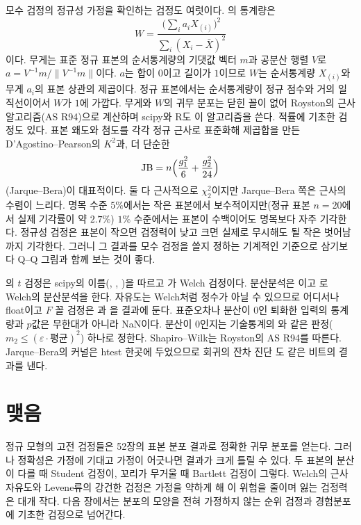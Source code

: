 모수 검정의 정규성 가정을 확인하는 검정도 여럿이다. 의 통계량은
\[
W=\frac{\bigl(\sum_ia_iX_{(i)}\bigr)^2}{\sum_i(X_i-\bar X)^2}
\]
이다\cite{shapiro1965}. 무게는 표준 정규 표본의 순서통계량의 기댓값 벡터 $m$과 공분산 행렬 $V$로 $a=V^{-1}m/\|V^{-1}m\|$이다. $a$는 합이 $0$이고 길이가 $1$이므로 $W$는 순서통계량 $X_{(i)}$와 무게 $a_i$의 표본 상관의 제곱이다. 정규 표본에서는 순서통계량이 정규 점수와 거의 일직선이어서 $W$가 $1$에 가깝다. 무게와 $W$의 귀무 분포는 닫힌 꼴이 없어 Royston의 근사 알고리즘(AS R94)으로 계산하며\cite{royston1995} scipy와 R도 이 알고리즘을 쓴다. 적률에 기초한 검정도 있다. 표본 왜도와 첨도를 각각 정규 근사로 표준화해 제곱합을 만든 D'Agostino--Pearson의 $K^2$\cite{dagostino1973}과, 더 단순한
\[
\mathrm{JB}=n\Bigl(\frac{g_1^2}6+\frac{g_2^2}{24}\Bigr)
\]
(Jarque--Bera\cite{jarque1980})이 대표적이다. 둘 다 근사적으로 $\chi^2_2$이지만 Jarque--Bera 쪽은 근사의 수렴이 느리다. 명목 수준 $5\%$에서는 작은 표본에서 보수적이지만(정규 표본 $n=20$에서 실제 기각률이 약 $2.7\%$) $1\%$ 수준에서는 표본이 수백이어도 명목보다 자주 기각한다. 정규성 검정은 표본이 작으면 검정력이 낮고 크면 실제로 무시해도 될 작은 벗어남까지 기각한다. 그러니 그 결과를 모수 검정을 쓸지 정하는 기계적인 기준으로 삼기보다 Q--Q 그림과 함께 보는 것이 좋다.

\begin{instardust}
의 $t$ 검정은 scipy의 이름(, , )을 따르고 가 Welch 검정이다. 분산분석은 이고 로 Welch의 분산분석을 한다. 자유도는 Welch처럼 정수가 아닐 수 있으므로 어디서나 float이고 $F$ 꼴 검정은 과 을 결과에 둔다. 표준오차나 분산이 $0$인 퇴화한 입력의 통계량과 $p$값은 무한대가 아니라 NaN이다. 분산이 $0$인지는 기술통계의 와 같은 판정($m_2\le(\varepsilon\cdot\text{평균})^2$) 하나로 정한다. Shapiro--Wilk는 Royston의 AS R94를 따른다. Jarque--Bera의 커널은 htest 한곳에 두었으므로 회귀의 잔차 진단 도 같은 비트의 결과를 낸다.
\end{instardust}

\section{맺음}

정규 모형의 고전 검정들은 52장의 표본 분포 결과로 정확한 귀무 분포를 얻는다. 그러나 정확성은 가정에 기대고 가정이 어긋나면 결과가 크게 틀릴 수 있다. 두 표본의 분산이 다를 때 Student 검정이, 꼬리가 무거울 때 Bartlett 검정이 그렇다. Welch의 근사 자유도와 Levene류의 강건한 검정은 가정을 약하게 해 이 위험을 줄이며 잃는 검정력은 대개 작다. 다음 장에서는 분포의 모양을 전혀 가정하지 않는 순위 검정과 경험분포에 기초한 검정으로 넘어간다.

\chapterreferences
